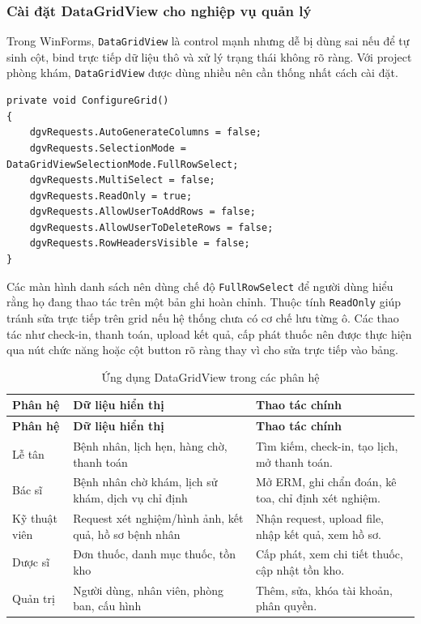 \documentclass[12pt,a4paper]{article}
\numberwithin{figure}{subsection}
\numberwithin{table}{subsection}
\newcounter{codecounter}
\newenvironment{codeblock}[2]{%
    \refstepcounter{codecounter}%
    \phantomsection%
    \label{#1}%
    \par\smallskip
}{%
    \par\smallskip
}
\begin{document}
\subsubsection{Cài đặt DataGridView cho nghiệp vụ quản lý}

Trong WinForms, \texttt{DataGridView} là control mạnh nhưng dễ bị dùng sai nếu để tự sinh cột, bind trực tiếp dữ liệu thô và xử lý trạng thái không rõ ràng. Với project phòng khám, \texttt{DataGridView} được dùng nhiều nên cần thống nhất cách cài đặt.

\begin{codeblock}{code:datagridview-config}{Cấu hình DataGridView cho bảng nghiệp vụ}
\begin{verbatim}
private void ConfigureGrid()
{
    dgvRequests.AutoGenerateColumns = false;
    dgvRequests.SelectionMode = DataGridViewSelectionMode.FullRowSelect;
    dgvRequests.MultiSelect = false;
    dgvRequests.ReadOnly = true;
    dgvRequests.AllowUserToAddRows = false;
    dgvRequests.AllowUserToDeleteRows = false;
    dgvRequests.RowHeadersVisible = false;
}
\end{verbatim}
\end{codeblock}

Các màn hình danh sách nên dùng chế độ \texttt{FullRowSelect} để người dùng hiểu rằng họ đang thao tác trên một bản ghi hoàn chỉnh. Thuộc tính \texttt{ReadOnly} giúp tránh sửa trực tiếp trên grid nếu hệ thống chưa có cơ chế lưu từng ô. Các thao tác như check-in, thanh toán, upload kết quả, cấp phát thuốc nên được thực hiện qua nút chức năng hoặc cột button rõ ràng thay vì cho sửa trực tiếp vào bảng.

\begin{longtable}{|p{3.4cm}|p{4.6cm}|p{5.8cm}|}
\caption{Ứng dụng DataGridView trong các phân hệ} \\
\hline
\textbf{Phân hệ} & \textbf{Dữ liệu hiển thị} & \textbf{Thao tác chính} \\
\hline
\endfirsthead
\hline
\textbf{Phân hệ} & \textbf{Dữ liệu hiển thị} & \textbf{Thao tác chính} \\
\hline
\endhead
Lễ tân & Bệnh nhân, lịch hẹn, hàng chờ, thanh toán & Tìm kiếm, check-in, tạo lịch, mở thanh toán. \\
\hline
Bác sĩ & Bệnh nhân chờ khám, lịch sử khám, dịch vụ chỉ định & Mở ERM, ghi chẩn đoán, kê toa, chỉ định xét nghiệm. \\
\hline
Kỹ thuật viên & Request xét nghiệm/hình ảnh, kết quả, hồ sơ bệnh nhân & Nhận request, upload file, nhập kết quả, xem hồ sơ. \\
\hline
Dược sĩ & Đơn thuốc, danh mục thuốc, tồn kho & Cấp phát, xem chi tiết thuốc, cập nhật tồn kho. \\
\hline
Quản trị & Người dùng, nhân viên, phòng ban, cấu hình & Thêm, sửa, khóa tài khoản, phân quyền. \\
\hline
\end{longtable}
\end{document}
